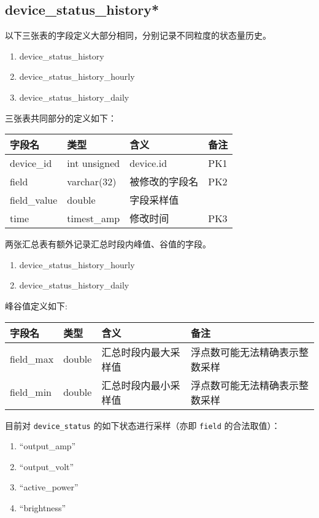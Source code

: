 \subsection{device\_status\_history*}\label{deviceux5fstatusux5fhistory}

以下三张表的字段定义大部分相同，分别记录不同粒度的状态量历史。

\begin{enumerate}
\def\labelenumi{\arabic{enumi}.}
\itemsep1pt\parskip0pt
\item
  device\_status\_history
\item
  device\_status\_history\_hourly
\item
  device\_status\_history\_daily
\end{enumerate}

三张表共同部分的定义如下：

\begin{longtabu}[c]{@{}lXXX@{}}
\toprule
字段名 & 类型 & 含义 & 备注\tabularnewline
\midrule
\endhead
device\_id & int unsigned & device.id & PK1\tabularnewline
field & varchar(32) & 被修改的字段名 & PK2\tabularnewline
field\_value & double & 字段采样值 &\tabularnewline
time & timest\_amp & 修改时间 & PK3\tabularnewline
\bottomrule
\end{longtabu}

两张汇总表有额外记录汇总时段内峰值、谷值的字段。

\begin{enumerate}
\def\labelenumi{\arabic{enumi}.}
\itemsep1pt\parskip0pt
\item
  device\_status\_history\_hourly
\item
  device\_status\_history\_daily
\end{enumerate}

峰谷值定义如下:

\begin{longtabu}[c]{@{}lXXX@{}}
\toprule
字段名 & 类型 & 含义 & 备注\tabularnewline
\midrule
\endhead
field\_max & double & 汇总时段内最大采样值 &
浮点数可能无法精确表示整数采样\tabularnewline
field\_min & double & 汇总时段内最小采样值 &
浮点数可能无法精确表示整数采样\tabularnewline
\bottomrule
\end{longtabu}

目前对 \texttt{device\_status} 的如下状态进行采样（亦即 \texttt{field}
的合法取值）：

\begin{enumerate}
\def\labelenumi{\arabic{enumi}.}
\itemsep1pt\parskip0pt
\item
  ``output\_amp''
\item
  ``output\_volt''
\item
  ``active\_power''
\item
  ``brightness''
\end{enumerate}

